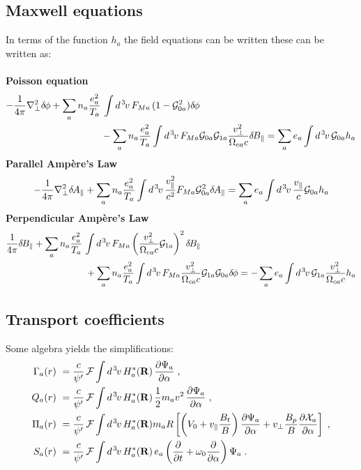 \subsection{Maxwell equations}

In terms of the function $h_a$ the field equations can be written
these can be written as:\\
\\
%
{\bf Poisson equation}
%
\begin{align}
-\frac{1}{4 \pi} \nabla_\perp^2 \delta \hskip -1pt \phi 
+ \sum_a n_a \frac{e_a^2}{T_a} & \, \int d^{\hskip 1pt 3} \hskip -1pt v \, F_{Ma} \, (1-{\cal G}_{0a}^2) \delta \hskip -1pt \phi 
\nonumber \\
& - \sum_a n_a \frac{e_a^2}{T_a} \int d^{\hskip 1pt 3} \hskip -1pt v \, F_{Ma} {\cal G}_{0a} {\cal G}_{1a}
  \frac{v_\perp^2}{\Omega_{ca} c} \delta \hskip -1pt B_\parallel 
= \sum_a e_a \int d^{\hskip 1pt 3} \hskip -1pt v \, {\cal G}_{0a} h_a 
 \label{eq.maxp}
\end{align}
%
{\bf Parallel Amp\`ere's Law}
%
\begin{equation}
-\frac{1}{4 \pi} \nabla_\perp^2 \delta \hskip -1pt A_\parallel 
+ \sum_a n_a \frac{e_a^2}{T_a} \int d^{\hskip 1pt 3} \hskip -1pt v \, \frac{v_\parallel^2}{c^2} F_{Ma} {\cal G}_{0a}^2 \delta \hskip -1pt A_\parallel
= \sum_a e_a \int d^{\hskip 1pt 3} \hskip -1pt v \, \frac{v_\parallel}{c} {\cal G}_{0a} h_a 
 \label{eq.maxa1}
\end{equation}
%
{\bf Perpendicular Amp\`ere's Law}
%
\begin{align}
\frac{1}{4 \pi} \delta \hskip -1pt B_\parallel + \sum_a n_a \frac{e_a^2}{T_a} & \, \int d^{\hskip 1pt 3} \hskip -1pt v \, F_{Ma} 
\left( \frac{v_\perp^2}{\Omega_{ca} c} {\cal G}_{1a} \right)^2 \delta \hskip -1pt B_\parallel
\nonumber \\
&~ + \sum_a n_a \frac{e_a^2}{T_a} \int d^{\hskip 1pt 3} \hskip -1pt v \, F_{Ma} 
\frac{v_\perp^2}{\Omega_{ca} c} {\cal G}_{1a} {\cal G}_{0a} \delta \hskip -1pt \phi
= -\sum_a e_a \int d^{\hskip 1pt 3} \hskip -1pt v \, {\cal G}_{1a} \frac{v_\perp^2}{\Omega_{ca} c} h_a 
 \label{eq.maxa2}
\end{align}
%
\subsection{Transport coefficients}

Some algebra yields the simplifications:
%
\begin{align}
\Gamma_a(r) &~= \frac{c}{\psi^\prime} \, {\cal F} \int d^{\hskip 1pt 3} \hskip -1pt v \, H_a^*(\mathbf{R}) \, 
  \frac{\partial\Psi_a}{\partial\alpha} \; , 
 \label{eq.flux1}\\
Q_a(r) &~= \frac{c}{\psi^\prime} \, {\cal F} \int d^{\hskip 1pt 3} \hskip -1pt v \, H_a^*(\mathbf{R}) \, 
  \frac{1}{2} m_a v^2 \,
  \frac{\partial\Psi_a}{\partial\alpha} \; , 
 \label{eq.flux2} \\
\Pi_a(r) &~= \frac{c}{\psi^\prime} \, 
   {\cal F} \int d^{\hskip 1pt 3} \hskip -1pt v \, H_a^*(\mathbf{R}) m_a R \left[ 
   \left( V_0 + v_\parallel \frac{B_t}{B} \right) \frac{\partial\Psi_a}{\partial\alpha} 
+ v_\perp \frac{B_p}{B} \frac{\partial\mathcal{X}_a}{\partial\alpha} 
 \right] \; , 
 \label{eq.flux3}  \\
S_a(r) &~= \frac{c}{\psi^\prime} \, 
  {\cal F} \int d^{\hskip 1pt 3} \hskip -1pt v \, H_a^*(\mathbf{R}) \, e_a 
  \left( \frac{\partial}{\partial t} + 
  \omega_0 \frac{\partial}{\partial \alpha} \right) \Psi_a \; .
  \label{eq.flux4}  
\end{align}
